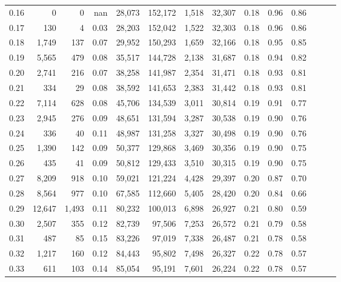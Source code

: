 \begin{tabular}{rrrrrrrrrrrrrr}
0.16 &       0 &      0 &   nan &   28,073 &  152,172 &   1,518 &  32,307 &  0.18 &  0.96 &      0.86 \\
0.17 &     130 &      4 &  0.03 &   28,203 &  152,042 &   1,522 &  32,303 &  0.18 &  0.96 &      0.86 \\
0.18 &   1,749 &    137 &  0.07 &   29,952 &  150,293 &   1,659 &  32,166 &  0.18 &  0.95 &      0.85 \\
0.19 &   5,565 &    479 &  0.08 &   35,517 &  144,728 &   2,138 &  31,687 &  0.18 &  0.94 &      0.82 \\
0.20 &   2,741 &    216 &  0.07 &   38,258 &  141,987 &   2,354 &  31,471 &  0.18 &  0.93 &      0.81 \\
0.21 &     334 &     29 &  0.08 &   38,592 &  141,653 &   2,383 &  31,442 &  0.18 &  0.93 &      0.81 \\
0.22 &   7,114 &    628 &  0.08 &   45,706 &  134,539 &   3,011 &  30,814 &  0.19 &  0.91 &      0.77 \\
0.23 &   2,945 &    276 &  0.09 &   48,651 &  131,594 &   3,287 &  30,538 &  0.19 &  0.90 &      0.76 \\
0.24 &     336 &     40 &  0.11 &   48,987 &  131,258 &   3,327 &  30,498 &  0.19 &  0.90 &      0.76 \\
0.25 &   1,390 &    142 &  0.09 &   50,377 &  129,868 &   3,469 &  30,356 &  0.19 &  0.90 &      0.75 \\
0.26 &     435 &     41 &  0.09 &   50,812 &  129,433 &   3,510 &  30,315 &  0.19 &  0.90 &      0.75 \\
0.27 &   8,209 &    918 &  0.10 &   59,021 &  121,224 &   4,428 &  29,397 &  0.20 &  0.87 &      0.70 \\
0.28 &   8,564 &    977 &  0.10 &   67,585 &  112,660 &   5,405 &  28,420 &  0.20 &  0.84 &      0.66 \\
0.29 &  12,647 &  1,493 &  0.11 &   80,232 &  100,013 &   6,898 &  26,927 &  0.21 &  0.80 &      0.59 \\
0.30 &   2,507 &    355 &  0.12 &   82,739 &   97,506 &   7,253 &  26,572 &  0.21 &  0.79 &      0.58 \\
0.31 &     487 &     85 &  0.15 &   83,226 &   97,019 &   7,338 &  26,487 &  0.21 &  0.78 &      0.58 \\
0.32 &   1,217 &    160 &  0.12 &   84,443 &   95,802 &   7,498 &  26,327 &  0.22 &  0.78 &      0.57 \\
0.33 &     611 &    103 &  0.14 &   85,054 &   95,191 &   7,601 &  26,224 &  0.22 &  0.78 &      0.57 \\

\end{tabular}
